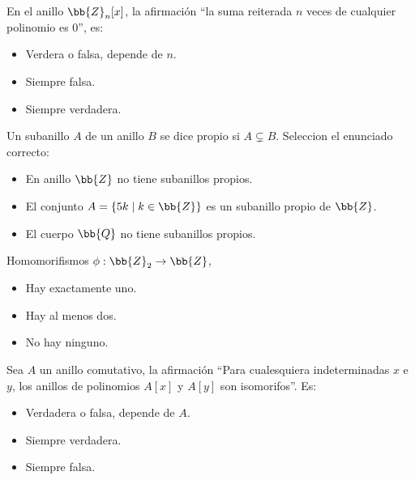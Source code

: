 \documentclass[12pt]{article}
\newcounter{ejercicio}[section] %
\newcounter{ejercicio}
\begin{document}
    \begin{ejercicio}
        En el anillo $\bb{Z}_n[x]$, la afirmación ``la suma reiterada $n$ veces de cualquier polinomio es $0$'', es:
        \begin{itemize}
            \item Verdera o falsa, depende de $n$.
            \item Siempre falsa.
            \item Siempre verdadera.
        \end{itemize}
    \end{ejercicio}

    \begin{ejercicio}
        Un subanillo $A$ de un anillo $B$ se dice propio si $A \subsetneq B$. Seleccion el enunciado correcto:
        \begin{itemize}
            \item En anillo $\bb{Z}$ no tiene subanillos propios.
            \item El conjunto $A = \{ 5k \mid k \in \bb{Z} \}$ es un subanillo propio de $\bb{Z}$.
            \item El cuerpo $\bb{Q}$ no tiene subanillos propios.
        \end{itemize}
    \end{ejercicio}

    \begin{ejercicio}
        Homomorifismos $\phi : \bb{Z}_2 \rightarrow \bb{Z}$,
        \begin{itemize}
            \item Hay exactamente uno.
            \item Hay al menos dos.
            \item No hay ninguno.
        \end{itemize}
    \end{ejercicio}

    \begin{ejercicio}
        Sea $A$ un anillo comutativo, la afirmación ``Para cualesquiera indeterminadas $x$ e $y$, los anillos de polinomios $A[x]$ y $A[y]$ son isomorifos''. Es:
        \begin{itemize}
            \item Verdadera o falsa, depende de $A$.
            \item Siempre verdadera.
            \item Siempre falsa.
        \end{itemize}
    \end{ejercicio}
\end{document}
